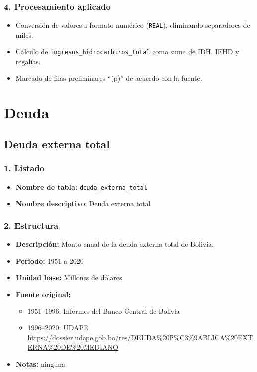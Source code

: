 \documentclass[12pt,a4paper]{article}
\begin{document}
\subsubsection*{4. Procesamiento aplicado}
\begin{itemize}
  \item Conversión de valores a formato numérico (\texttt{REAL}), eliminando separadores de miles.
  \item Cálculo de \texttt{ingresos\_hidrocarburos\_total} como suma de IDH, IEHD y regalías.
  \item Marcado de filas preliminares “(p)” de acuerdo con la fuente.
\end{itemize}



\section{Deuda}

\subsection{Deuda externa total}

\subsubsection*{1. Listado}
\begin{itemize}
  \item \textbf{Nombre de tabla:} \texttt{deuda\_externa\_total}
  \item \textbf{Nombre descriptivo:} Deuda externa total
\end{itemize}

\subsubsection*{2. Estructura}
\begin{itemize}
  \item \textbf{Descripción:} Monto anual de la deuda externa total de Bolivia.
  \item \textbf{Periodo:} 1951 a 2020
  \item \textbf{Unidad base:} Millones de dólares
  \item \textbf{Fuente original:}
    \begin{itemize}
      \item 1951–1996: Informes del Banco Central de Bolivia
      \item 1996–2020: UDAPE\\
        \url{https://dossier.udape.gob.bo/res/DEUDA%20P%C3%9ABLICA%20EXTERNA%20DE%20MEDIANO}
    \end{itemize}
  \item \textbf{Notas:} ninguna
\end{itemize}
\end{document}
